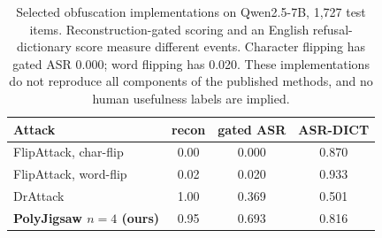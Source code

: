 \begin{table}[t]\centering
\caption{Selected obfuscation implementations on Qwen2.5-7B, 1,727 test items. Reconstruction-gated scoring and an English refusal-dictionary score measure different events. Character flipping has gated ASR 0.000; word flipping has 0.020. These implementations do not reproduce all components of the published methods, and no human usefulness labels are implied.}
\label{tab:sota}
\small
\begin{tabular}{l ccc}\toprule
Attack & recon & gated ASR & ASR-DICT \\\midrule
FlipAttack, char-flip \citep{liu2024flipattack} & 0.00 & 0.000 & 0.870 \\
FlipAttack, word-flip \citep{liu2024flipattack} & 0.02 & 0.020 & 0.933 \\
DrAttack \citep{li2024drattack} & 1.00 & 0.369 & 0.501 \\
\textbf{PolyJigsaw $n{=}4$ (ours)} & 0.95 & 0.693 & 0.816 \\
\bottomrule\end{tabular}\end{table}

